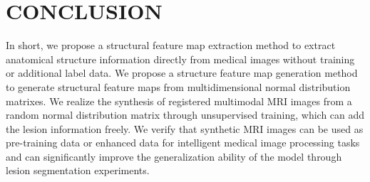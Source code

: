 \documentclass{ecai}
\begin{document}
\section{CONCLUSION}
In short, we propose a structural feature map extraction method to extract anatomical structure information directly from medical images without training or additional label data.
We propose a structure feature map generation method to generate structural feature maps from multidimensional normal distribution matrixes.
We realize the synthesis of registered multimodal MRI images from a random normal distribution matrix through unsupervised training, which can add the lesion information freely.
We verify that synthetic MRI images can be used as pre-training data or enhanced data for intelligent medical image processing tasks and can significantly improve the generalization ability of the model through lesion segmentation experiments.

\end{document}
